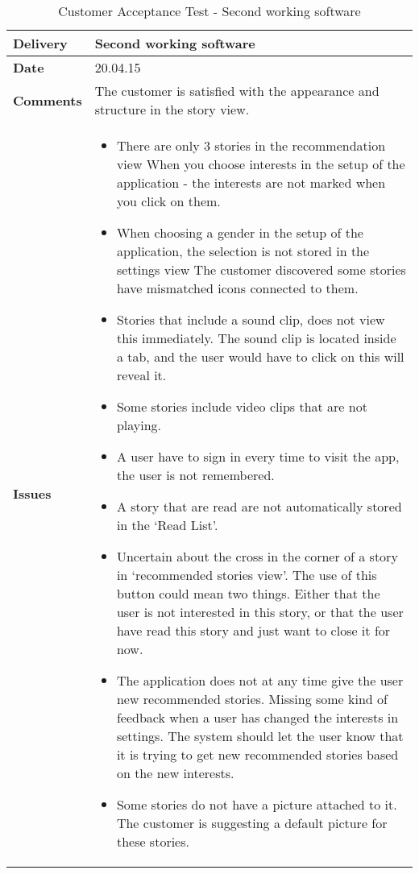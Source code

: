 			\renewcommand{\arraystretch}{2}%
			\begin{center}
				\begin{longtable}{ | p{4cm} | p{13cm} | }
					
					\caption[Customer Acceptance test]{Customer Acceptance Test - Second working software} \label{Tab:cattest4}\\
					\hline
					\textbf{Delivery} & Second working software\\ \hline
					\textbf{Date} & 20.04.15\\ \hline
					\textbf{Comments} & The customer is satisfied with the appearance and structure in the story view. 
					\\ \hline
					\textbf{Issues} & 
					\begin{itemize}[noitemsep]
						
						\item There are only 3 stories in the recommendation view 
						When you choose interests in the setup of the application - the interests are not marked when you click on them. \newline
						\item When choosing a gender in the setup of the application, the selection is not stored in the settings view
						The customer discovered some stories have mismatched icons connected to them. \newline
						\item Stories that include a sound clip, does not view this immediately. The sound clip is located inside a tab, and the user would have to click on this will reveal it. \newline
						\item  Some stories include video clips that are not playing.  \newline
						\item  A user have to sign in every time to visit the app, the user is not remembered. \newline
						\item  A story that are read are not automatically stored in the ‘Read List’. \newline
						\item  Uncertain about the cross in the corner of a story in ‘recommended stories view’. The use of this button could mean two things. Either that the user is not interested in this story, or that the user have read this story and just want to close it for now. \newline
						\item  The application does not at any time give the user new recommended stories. \newline
						Missing some kind of feedback when a user has changed the interests in settings. The system should let the user know that it is trying to get new recommended stories based on the new interests. \newline
						\item Some stories do not have a picture attached to it. The customer is suggesting a default picture for these stories.
					\end{itemize}
					\\ \hline 
					

\end{longtable}
\end{center}
